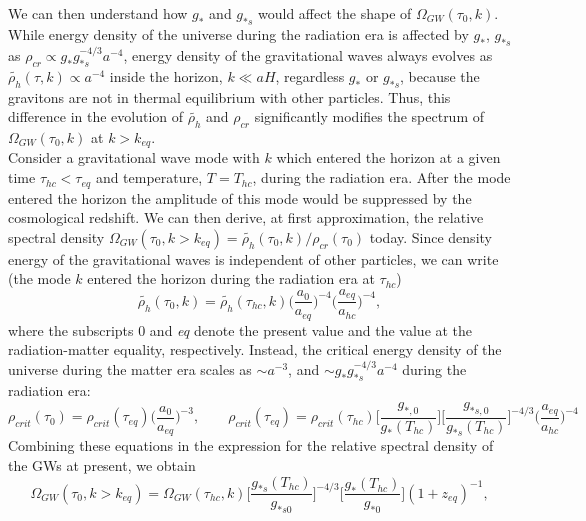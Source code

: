 \documentclass[11pt,a4paper,twoside]{book}
\begin{document}
We can then understand how $ g_{*} $ and $ g_{*s} $ would affect the shape of $ \Omega_{GW}(\tau_{0},k) $. While energy density of the universe  during the radiation era is affected by $ g_{*} $, $ g_{*s} $ as $ \rho_{cr} \propto g_{*}g_{*s}^{-4/3}a^{-4} $, energy density of the gravitational waves always evolves as $\tilde{\rho_{h}}(\tau,k) \propto a^{-4}$ inside the horizon, $ k \ll aH $, regardless $ g_{*} $ or $ g_{*s} $, because the gravitons are not in thermal equilibrium with other particles. Thus, this difference in the evolution of $ \tilde{\rho_{h}} $ and $ \rho_{cr} $ significantly modifies the spectrum of $ \Omega_{GW}(\tau_{0},k) $ at $ k>k_{eq} $.\\
Consider  a gravitational wave mode with $ k $ which entered the horizon at a given time $ \tau_{hc} < \tau_{eq} $ and temperature, $ T=T_{hc} $, during the radiation era. After the mode entered the horizon the amplitude of this mode would be suppressed by the cosmological redshift. We can then derive, at first approximation, the relative spectral density $\Omega_{GW}(\tau_{0},k > k_{eq}) = \tilde{\rho_{h}}(\tau_{0},k)/\rho_{cr}(\tau_{0})$ today. Since density energy of the gravitational waves is independent of other particles, we can write (the mode $ k $ entered the horizon during the radiation era at $ \tau_{hc} $)
\begin{equation}
 \tilde{\rho_{h}}(\tau_{0},k) =  \tilde{\rho_{h}}(\tau_{hc},k)\Big (\frac{a_{0}}{a_{eq}}\Big)^{-4}\Big (\frac{a_{eq}}{a_{hc}}\Big)^{-4},
\end{equation}
where the subscripts 0 and \textit{eq} denote the present value and the value at the radiation-matter equality, respectively.
Instead, the critical energy density of the universe during the matter era scales as $\sim a^{-3}$, and $ \sim g_{*}g_{*s}^{-4/3}a^{-4} $ during  the radiation era:
\begin{equation}
	\label{Chap3:CriticalDensityEvolution1}
	\rho_{crit}(\tau_{0})=\rho_{crit}(\tau_{eq})\Big(\frac{a_{0}}{a_{eq}}\Big)^{-3},
	\qquad
	\rho_{crit}(\tau_{eq})= \rho_{crit}(\tau_{hc})\Big[\frac{g_{*,0}}{g_{*}(T_{hc})}\Big]\Big [\frac{g_{*s,0}}{g_{*s}(T_{hc})}\Big]^{-4/3}\Big(\frac{a_{eq}}{a_{hc}}\Big)^{-4}
\end{equation}  
Combining these equations in the expression for the relative spectral density of the GWs at present, we obtain
\begin{equation}
	\label{Chap3:SpectralDensityAtPresent}
	\Omega_{GW}(\tau_{0}, k>k_{eq}) = \Omega_{GW}(\tau_{hc},k)\Big[\frac{g_{*s}(T_{hc})}{g_{*s0}}\Big]^{-4/3}\Big [\frac{g_{*}(T_{hc})}{g_{*0}}\Big] (1+z_{eq})^{-1},
\end{equation}
\end{document}
